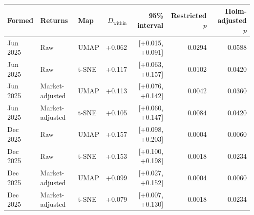 \begin{tabularx}{\linewidth}{@{}l >{\raggedright\arraybackslash}X l r r r r@{}}
\toprule
Formed & Returns & Map & $D_{\mathrm{within}}$ & 95\% interval & \shortstack{Restricted\\$p$} & \shortstack{Holm-adjusted\\$p$} \\
\midrule
Jun 2025 & Raw & UMAP & +0.062 & [+0.015, +0.091] & 0.0294 & 0.0588 \\
Jun 2025 & Raw & t-SNE & +0.117 & [+0.063, +0.157] & 0.0102 & 0.0420 \\
Jun 2025 & Market-adjusted & UMAP & +0.113 & [+0.076, +0.142] & 0.0042 & 0.0360 \\
Jun 2025 & Market-adjusted & t-SNE & +0.105 & [+0.060, +0.147] & 0.0084 & 0.0420 \\
Dec 2025 & Raw & UMAP & +0.157 & [+0.098, +0.203] & 0.0004 & 0.0060 \\
Dec 2025 & Raw & t-SNE & +0.153 & [+0.100, +0.198] & 0.0018 & 0.0234 \\
Dec 2025 & Market-adjusted & UMAP & +0.099 & [+0.027, +0.152] & 0.0004 & 0.0060 \\
Dec 2025 & Market-adjusted & t-SNE & +0.079 & [+0.007, +0.130] & 0.0018 & 0.0234 \\
\bottomrule
\end{tabularx}
